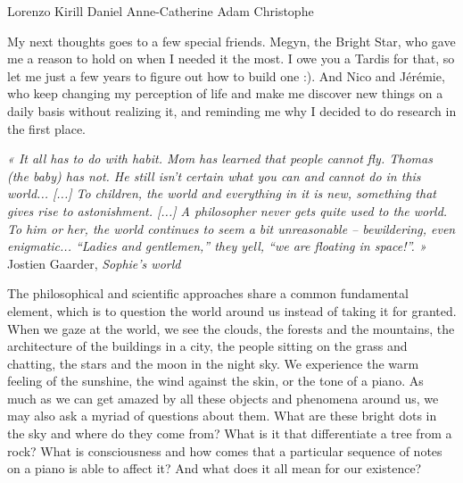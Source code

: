 Lorenzo
Kirill
Daniel
Anne-Catherine
Adam
Christophe

My next thoughts goes to a few special friends. Megyn, the Bright Star, who gave me a reason
to hold on when I needed it the most. I owe you a Tardis for that, so let me just a few 
years to figure out how to build one :). And Nico and Jérémie, who keep changing my 
perception of life and make me discover new things on a daily basis without realizing it, 
and reminding me why I decided to do research in the first place.


\emptypage
\thispagestyle{empty}

\dominitoc
\renewcommand{\leftmark}{Contents}
\tableofcontents

\newpage

\setcounter{page}{1}


\begin{center}
\begin{minipage}{0.95\textwidth}
\emph{« It all has to do with habit. Mom has learned that people cannot fly. Thomas (the baby) has
not. He still isn’t certain what you can and cannot do in this world...  [...] To children, the
world and everything in it is new, something that gives rise to astonishment. [...]
A philosopher never gets quite used to the world. To him or her, the world continues to seem
a bit unreasonable – bewildering, even enigmatic... “Ladies and gentlemen,” they yell,
“we are floating in space!”. »}\\
\hspace*{0.6\textwidth} Jostien Gaarder, \emph{Sophie's world}
\end{minipage}
\end{center}

\vspace*{0.5cm}

The philosophical and scientific approaches share a common fundamental element, which is to
question the world around us instead of taking it for granted. When we gaze at the world,
we see the clouds, the forests and the mountains, the architecture of the buildings in a
city, the people sitting on the grass and chatting,
the stars and the moon in the night sky. We experience the warm feeling of the sunshine,
the wind against the skin, or the tone of a piano. As much as we can get amazed by all these
objects and phenomena around us, we may also ask a myriad of questions about them. What
are these bright dots in the sky and where do they come from? What is it that differentiate
a tree from a rock? What is consciousness and how comes that a particular sequence of
notes on a piano is able to affect it? And what does it all mean for our existence?

